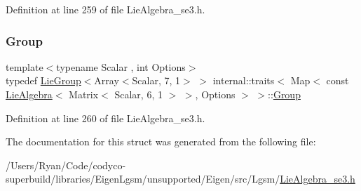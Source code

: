 Definition at line 259 of file Lie\+Algebra\+\_\+se3.\+h.

\hypertarget{structinternal_1_1traits_3_01_map_3_01const_01_lie_algebra_3_01_matrix_3_01_scalar_00_016_00_011bdc50eba447989365acf4f3cfd5e5212_affc6fce5ea66d7dd41c559a4a6cc8e0d}{}\label{structinternal_1_1traits_3_01_map_3_01const_01_lie_algebra_3_01_matrix_3_01_scalar_00_016_00_011bdc50eba447989365acf4f3cfd5e5212_affc6fce5ea66d7dd41c559a4a6cc8e0d} 
\subsubsection{\texorpdfstring{Group}{Group}}
{\footnotesize\ttfamily template$<$typename Scalar , int Options$>$ \\
typedef \hyperlink{class_lie_group}{Lie\+Group}$<$Array$<$Scalar, 7, 1$>$ $>$ internal\+::traits$<$ Map$<$ const \hyperlink{class_lie_algebra}{Lie\+Algebra}$<$ Matrix$<$ Scalar, 6, 1 $>$ $>$, Options $>$ $>$\+::\hyperlink{structinternal_1_1traits_3_01_map_3_01const_01_lie_algebra_3_01_matrix_3_01_scalar_00_016_00_011bdc50eba447989365acf4f3cfd5e5212_affc6fce5ea66d7dd41c559a4a6cc8e0d}{Group}}



Definition at line 260 of file Lie\+Algebra\+\_\+se3.\+h.



The documentation for this struct was generated from the following file\+:\begin{DoxyCompactItemize}
\item 
/\+Users/\+Ryan/\+Code/codyco-\/superbuild/libraries/\+Eigen\+Lgsm/unsupported/\+Eigen/src/\+Lgsm/\hyperlink{_lie_algebra__se3_8h}{Lie\+Algebra\+\_\+se3.\+h}\end{DoxyCompactItemize}
